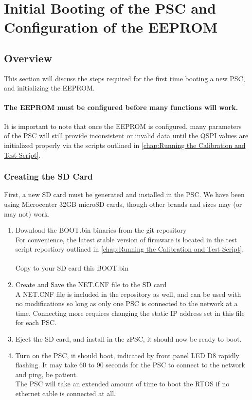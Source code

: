 
\chapter{Initial Booting of the PSC and Configuration of the EEPROM}
\label{chap:Initial Booting of the PSC and Configuration of the EEPROM}
\section{Overview}
This section will discuss the steps required for the first time booting a new PSC, and initializing the EEPROM.\\\\
\textbf{The EEPROM must be configured before many functions will work.}\\\\
It is important to note that once the EEPROM is configured, many parameters of the PSC will still provide inconsistent or invalid data until the QSPI values are initialized properly via the scripts outlined in \autoref{chap:Running the Calibration and Test Script}.

\subsection{Creating the SD Card}
First, a new SD card must be generated and installed in the PSC. We have been using Microcenter 32GB microSD cards, though other brands and sizes may (or may not) work.\\

\begin{enumerate}
	\item Download the BOOT.bin binaries from the git repository\\
	For convenience, the latest stable version of firmware is located in the test script repostiory outlined in \autoref{chap:Running the Calibration and Test Script}.\\\\
	Copy to your SD card this BOOT.bin
	
	\item Create and Save the NET.CNF file to the SD card\\
	A NET.CNF file is included in the repository as well, and can be used with no modifications so long as only one PSC is connected to the network at a time. Connecting more requires changing the static IP address set in this file for each PSC. 
	
	\item Eject the SD card, and install in the zPSC, it should now be ready to boot. 
	
	\item Turn on the PSC, it should boot, indicated by front panel LED D8 rapidly flashing. It may take 60 to 90 seconds for the PSC to connect to the network and ping, be patient.\\The PSC will take an extended amount of time to boot the RTOS if no ethernet cable is connected at all.  
\end{enumerate}

